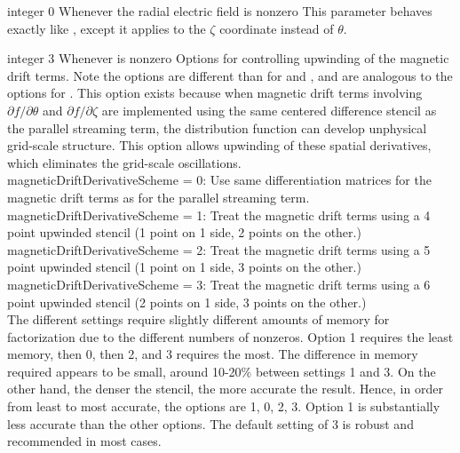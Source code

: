 \myhrule

{integer}
{0}
{Whenever the radial electric field is nonzero}
{This parameter behaves exactly like , except it applies to the $\zeta$ coordinate instead of $\theta$.}

\myhrule

{integer}
{3}
{Whenever  is nonzero}
{Options for controlling upwinding of the magnetic drift terms.  Note the options are different than for 
and , and are analogous to the options for .
This option exists because when magnetic drift terms involving $\partial f/\partial \theta$ and $\partial f/\partial\zeta$
are implemented using the same centered difference stencil as the parallel streaming term,
the distribution function can develop unphysical grid-scale structure.  This option allows upwinding of these spatial derivatives, which eliminates the grid-scale oscillations.\\

{\ttfamily magneticDriftDerivativeScheme} = 0: Use same differentiation matrices for the magnetic drift terms as for the parallel streaming term.\\

{\ttfamily magneticDriftDerivativeScheme} = 1: Treat the magnetic drift terms using a 4 point upwinded stencil (1 point on 1 side, 2 points on the other.)\\

{\ttfamily magneticDriftDerivativeScheme} = 2: Treat the magnetic drift terms using a 5 point upwinded stencil (1 point on 1 side, 3 points on the other.)\\

{\ttfamily magneticDriftDerivativeScheme} = 3: Treat the magnetic drift terms using a 6 point upwinded stencil (2 points on 1 side, 3 points on the other.)\\

The different settings require slightly different amounts of memory for factorization due to the different numbers of nonzeros. Option 1 requires the least memory, then 0, then 2,
and 3 requires the most.  The difference in memory required appears to be small, around 10-20\% between settings 1 and 3.
On the other hand, the denser the stencil, the more accurate the result. 
Hence, in order from least to most accurate, the options are 1, 0, 2, 3. Option 1 is substantially less accurate than the other options.
The default setting of 3 is robust and recommended in most cases.
}

